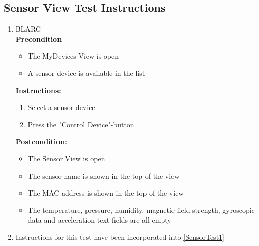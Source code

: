 \documentclass[a4paper]{article}
\newlength{\testlabellength}
\newenvironment{testlist}{\begin{enumerate}[label=\bfseries Instruction \thesubsection.\arabic* , labelindent=0pt, labelwidth=\testlabellength , leftmargin=2cm]}{\end{enumerate}}
\newenvironment{precondition}{
{\color{white}BLARG}\\ 
\textbf{Precondition}
\begin{itemize}[labelindent=0cm, labelwidth=2cm , leftmargin=1cm]
}
{\end{itemize}}
\newenvironment{instruction}{
\textbf{Instructions:}
\begin{enumerate}[label=\bfseries  \arabic*., labelindent=0cm, labelwidth=2cm , leftmargin=1cm]
}
{\end{enumerate}}
\newenvironment{postcondition}{
\textbf{Postcondition:}
\begin{itemize}[labelindent=0cm, labelwidth=2cm , leftmargin=1cm]
}
{\end{itemize}}
\begin{document}
\begin{appendices}
\begin{testlist}

\end{testlist}

\subsection{Sensor View Test Instructions}
\begin{testlist}


	\item \label{SensorTest1}
 		\begin{precondition}
 			\item The MyDevices View is open
 			\item A sensor device is available in the list
 		\end{precondition}
 		\begin{instruction}
 			\item Select a sensor device
 			\item Press the "Control Device"-button
 		\end{instruction}
 		\begin{postcondition}
 			\item The Sensor View is open
 			\item The sensor name is shown in the top of the view
 			\item The MAC address is shown in the top of the view
 			\item The temperature, pressure, humidity, magnetic field strength, gyroscopic data and acceleration text fields are all empty
 		\end{postcondition}


	\item
		Instructions for this test have been incorporated into \ref{SensorTest1}



\end{testlist}
\end{appendices}
\end{document}
